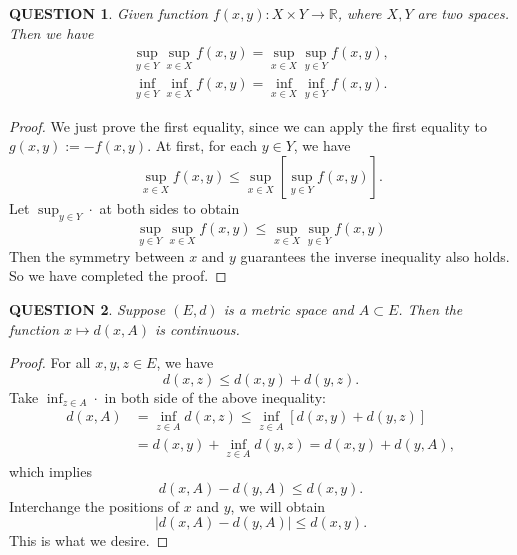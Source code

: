 \documentclass[12pt]{article}
\renewcommand{\(}{\left(}%
\renewcommand{\)}{\right)}%
\renewcommand{\[}{\left[}%
\renewcommand{\]}{\right]}%
\renewcommand{\r}{\mathbb{R}}
\newtheorem{question}{QUESTION}[section]}
\newtheorem{proof}{Proof.}}
\begin{document}
  \begin{question}
   Given function $f(x,y):X\times Y\to \r$, where $X,Y$ are two spaces. Then we have
   \begin{equation*}
    \begin{split}
     \sup_{y\in Y} \sup_{x\in X}f(x,y)=\sup_{x\in X} \sup_{y\in Y}f(x,y),\\
     \inf_{y\in Y} \inf_{x\in X}f(x,y)=\inf_{x\in X} \inf_{y\in Y}f(x,y).
    \end{split}
   \end{equation*}
  \end{question}
  \begin{proof}
   We just prove the first equality, since we can apply the first equality to $g(x,y):=-f(x,y)$. At first, for each $y\in Y$, we have
   \begin{equation*}
    \sup_{x\in X}f(x,y)\leq \sup_{x\in X} \[\sup_{y\in Y}f(x,y)\].
   \end{equation*}
   Let $\sup_{y\in Y}\cdot$ at both sides to obtain
   \begin{equation*}
    \sup_{y\in Y} \sup_{x\in X}f(x,y)\leq \sup_{x\in X} \sup_{y\in Y}f(x,y)
   \end{equation*}
   Then the symmetry between $x$ and $y$ guarantees the inverse inequality also holds. So we have completed the proof.
  \end{proof}

  \begin{question}
   Suppose $(E,d)$ is a metric space and $A\subset E$. Then the function $x\mapsto d(x,A)$ is continuous.
  \end{question}
  \begin{proof}
   For all $x,y,z\in E$, we have
   \begin{equation*}
    d(x,z)\leq d(x,y)+d(y,z).
   \end{equation*}
   Take $\inf_{z\in A}\cdot $ in both side of the above inequality:
   \begin{equation*}
    \begin{split}
     d(x,A)&=\inf_{z\in A}d(x,z)\leq \inf_{z\in A}[d(x,y)+d(y,z)]\\
     &=d(x,y)+\inf_{z\in A}d(y,z)=d(x,y)+d(y,A),
   \end{split}
   \end{equation*}
   which implies
   \begin{equation*}
    d(x,A)-d(y,A)\leq d(x,y).
   \end{equation*}
   Interchange the positions of $x$ and $y$, we will obtain
   \begin{equation*}
    |d(x,A)-d(y,A)|\leq d(x,y).
   \end{equation*}
   This is what we desire.
  \end{proof}
\end{document}
